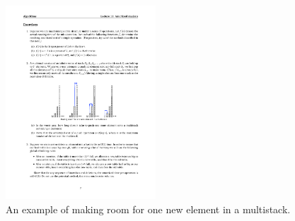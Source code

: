 \documentclass[12pt,a4paper]{article}
\theoremstyle{definition}
\begin{document}
\begin{enumerate}
	\begin{figure}[!htbp]
	\centering
	\includegraphics[width=0.5\textwidth]{Fig-MultiStack.pdf}
	\caption{An example of making room for one new element in a multistack.}
	\label{Fig-MultiStack}
	\end{figure}


\end{enumerate}
\end{document}
